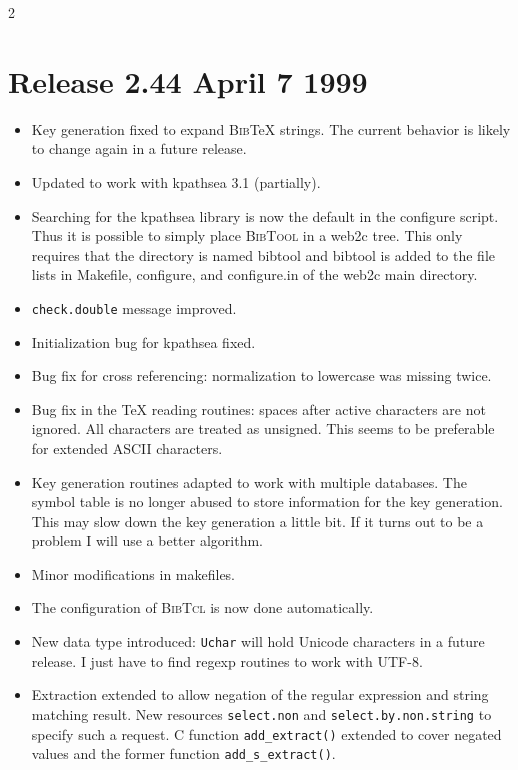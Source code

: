 \documentclass[11pt,a4paper]{scrartcl}
\newcommand\rsc[1]{\texttt{#1}}
\newcommand\BibTool{\textsc{BibTool}}
\newcommand\BibTcl{\textsc{BibTcl}}
\newcommand\BibTeX{\textsc{Bib}\TeX}
\newenvironment{Releases}{\begin{multicols}2\RaggedRight}{\end{multicols}}
\newenvironment{Release}[2]{%
  \def\tmp{#2}%
  \section*{Release #1 \ifx\tmp\empty\else{\normalsize[#2]}\fi}
  \begin{itemize}
}{\end{itemize}}
\newenvironment{Fix}[1]{\item }{}
\newenvironment{New}[1]{\item }{}
\newenvironment{Update}[1]{\item }{}
\begin{document}
\begin{Releases}
 \begin{Release}{2.44}{April 7 1999}
  \begin{Fix}{gene}
    Key generation fixed to expand \BibTeX{} strings. The current
    behavior is likely to change again in a future release.
  \end{Fix}
  \begin{Update}{gene}
    Updated to work with kpathsea 3.1 (partially).
  \end{Update}
  \begin{New}{gene}
    Searching for the kpathsea library is now the default in the
    configure script. Thus it is possible to simply place \BibTool{}
    in a web2c tree. This only requires that the directory is named
    bibtool and bibtool is added to the file lists in Makefile,
    configure, and configure.in of the web2c main directory.
  \end{New}
  \begin{Fix}{gene}
    \rsc{check.double} message improved.
  \end{Fix}
  \begin{Fix}{gene}
    Initialization bug for kpathsea fixed.
  \end{Fix}
  \begin{Fix}{gene}
    Bug fix for cross referencing: normalization to lowercase was
    missing twice.
  \end{Fix}
  \begin{Fix}{gene}
    Bug fix in the \TeX{} reading routines: spaces after active
    characters are not ignored. All characters are treated as
    unsigned. This seems to be preferable for extended ASCII
    characters.
  \end{Fix}
  \begin{Update}{gene}
    Key generation routines adapted to work with multiple databases.
    The symbol table is no longer abused to store information for the
    key generation. This may slow down the key generation a little
    bit. If it turns out to be a problem I will use a better
    algorithm.
  \end{Update}
  \begin{Update}{gene}
    Minor modifications in makefiles.
  \end{Update}
  \begin{New}{gene}
    The configuration of \BibTcl{} is now done automatically.
  \end{New}
  \begin{New}{gene}
    New data type introduced: \verb|Uchar| will hold Unicode characters in a
    future release. I just have to find regexp routines to work with UTF-8.
  \end{New}
  \begin{Update}{gene}
    Extraction extended to allow negation of the regular expression and string
    matching result. New resources \rsc{select.non} and
    \rsc{select.by.non.string} to specify such a request. C function
    \verb|add_extract()| extended to cover negated values and the former
    function \verb|add_s_extract()|.
  \end{Update}
 \end{Release}


\end{Releases}
\end{document}
